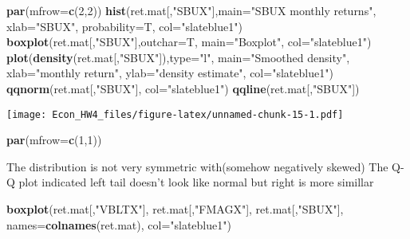 \documentclass[]{article}
\newenvironment{Shaded}{\begin{snugshade}}{\end{snugshade}}
\newcommand{\KeywordTok}[1]{\textcolor[rgb]{0.13,0.29,0.53}{\textbf{#1}}}
\newcommand{\DataTypeTok}[1]{\textcolor[rgb]{0.13,0.29,0.53}{#1}}
\newcommand{\DecValTok}[1]{\textcolor[rgb]{0.00,0.00,0.81}{#1}}
\newcommand{\StringTok}[1]{\textcolor[rgb]{0.31,0.60,0.02}{#1}}
\newcommand{\NormalTok}[1]{#1}
\begin{document}
\begin{Shaded}
\begin{Highlighting}[]
\KeywordTok{par}\NormalTok{(}\DataTypeTok{mfrow=}\KeywordTok{c}\NormalTok{(}\DecValTok{2}\NormalTok{,}\DecValTok{2}\NormalTok{))}
    \KeywordTok{hist}\NormalTok{(ret.mat[,}\StringTok{"SBUX"}\NormalTok{],}\DataTypeTok{main=}\StringTok{"SBUX monthly returns"}\NormalTok{,}
         \DataTypeTok{xlab=}\StringTok{"SBUX"}\NormalTok{, }\DataTypeTok{probability=}\NormalTok{T, }\DataTypeTok{col=}\StringTok{"slateblue1"}\NormalTok{)}
    \KeywordTok{boxplot}\NormalTok{(ret.mat[,}\StringTok{"SBUX"}\NormalTok{],}\DataTypeTok{outchar=}\NormalTok{T, }\DataTypeTok{main=}\StringTok{"Boxplot"}\NormalTok{, }\DataTypeTok{col=}\StringTok{"slateblue1"}\NormalTok{)}
    \KeywordTok{plot}\NormalTok{(}\KeywordTok{density}\NormalTok{(ret.mat[,}\StringTok{"SBUX"}\NormalTok{]),}\DataTypeTok{type=}\StringTok{"l"}\NormalTok{, }\DataTypeTok{main=}\StringTok{"Smoothed density"}\NormalTok{,}
         \DataTypeTok{xlab=}\StringTok{"monthly return"}\NormalTok{, }\DataTypeTok{ylab=}\StringTok{"density estimate"}\NormalTok{, }\DataTypeTok{col=}\StringTok{"slateblue1"}\NormalTok{)}
    \KeywordTok{qqnorm}\NormalTok{(ret.mat[,}\StringTok{"SBUX"}\NormalTok{], }\DataTypeTok{col=}\StringTok{"slateblue1"}\NormalTok{)}
    \KeywordTok{qqline}\NormalTok{(ret.mat[,}\StringTok{"SBUX"}\NormalTok{])}
\end{Highlighting}
\end{Shaded}

\texttt{[image: Econ\_HW4\_files/figure-latex/unnamed-chunk-15-1.pdf]}

\begin{Shaded}
\begin{Highlighting}[]
\KeywordTok{par}\NormalTok{(}\DataTypeTok{mfrow=}\KeywordTok{c}\NormalTok{(}\DecValTok{1}\NormalTok{,}\DecValTok{1}\NormalTok{))}
\end{Highlighting}
\end{Shaded}

The distribution is not very symmetric with(somehow negatively skewed)
The Q-Q plot indicated left tail doesn't look like normal but right is
more simillar

\begin{Shaded}
\begin{Highlighting}[]
\KeywordTok{boxplot}\NormalTok{(ret.mat[,}\StringTok{"VBLTX"}\NormalTok{], ret.mat[,}\StringTok{"FMAGX"}\NormalTok{], ret.mat[,}\StringTok{"SBUX"}\NormalTok{],}
        \DataTypeTok{names=}\KeywordTok{colnames}\NormalTok{(ret.mat), }\DataTypeTok{col=}\StringTok{"slateblue1"}\NormalTok{)}
\end{Highlighting}
\end{Shaded}
\end{document}
